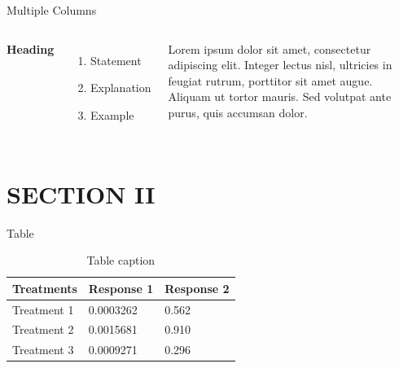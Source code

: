 \documentclass[aspectratio=169,xcolor=dvipsnames]{beamer}
\begin{document}

\begin{frame}{Multiple Columns}
    \begin{columns}[c] %

        \textbf{Heading}
        \begin{enumerate}
            \item Statement
            \item Explanation
            \item Example
        \end{enumerate}

        Lorem ipsum dolor sit amet, consectetur adipiscing elit. Integer lectus nisl, ultricies in feugiat rutrum, porttitor sit amet augue. Aliquam ut tortor mauris. Sed volutpat ante purus, quis accumsan dolor.

    \end{columns}
\end{frame}

\section{SECTION II}

\begin{frame}{Table}
    \begin{table}
        \begin{tabular}{l l l}
            \toprule
            \textbf{Treatments} & \textbf{Response 1} & \textbf{Response 2} \\
            \midrule
            Treatment 1         & 0.0003262           & 0.562               \\
            Treatment 2         & 0.0015681           & 0.910               \\
            Treatment 3         & 0.0009271           & 0.296               \\
            \bottomrule
        \end{tabular}
        \caption{Table caption}
    \end{table}
\end{frame}

\end{document}
